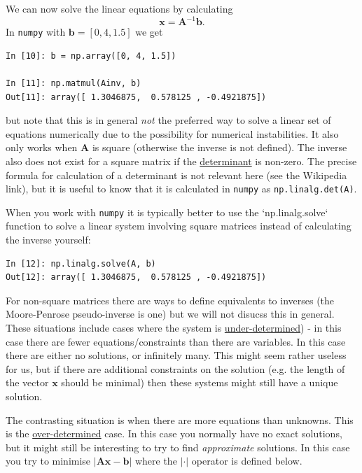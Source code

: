\documentclass[a4paper,10pt]{article}
\newcommand{\link}[2]{{\color{blue}\href{#1}{#2}}}
\begin{document}
We can now solve the linear equations by calculating
$$\mathbf{x} = \mathbf{A}^{-1} \mathbf{b}.$$ In \texttt{numpy} with $\mathbf{b}=[0,  4, 1.5]$ we get

\begin{lstlisting}
In [10]: b = np.array([0, 4, 1.5])

In [11]: np.matmul(Ainv, b)
Out[11]: array([ 1.3046875,  0.578125 , -0.4921875])
\end{lstlisting}

but note that this is in general \textit{not} the preferred way to solve a linear set of equations numerically due to the possibility for numerical instabilities. It also only works when $\mathbf{A}$ is square (otherwise the inverse is not defined). The inverse also does not exist for a square matrix if the \link{https://en.wikipedia.org/wiki/Determinant}{determinant} is non-zero. The precise formula for calculation of a determinant is not relevant here (see the Wikipedia link), but it is useful to know that it is calculated in \texttt{numpy} as \texttt{np.linalg.det(A)}. 

When you work with \texttt{numpy} it is typically better to use the `np.linalg.solve` function to solve a linear system involving square matrices instead of calculating the inverse yourself:
\begin{lstlisting}
In [12]: np.linalg.solve(A, b)
Out[12]: array([ 1.3046875,  0.578125 , -0.4921875])
\end{lstlisting}

For non-square matrices there are ways to define equivalents to inverses (the Moore-Penrose pseudo-inverse is one) but we will not disucss this in general. These situations include cases where the system is \link{https://en.wikipedia.org/wiki/Underdetermined_system}{under-determined}) - in this case there are fewer equations/constraints than there are variables. In this case there are either no solutions, or infinitely many. This might seem rather useless for us, but if there are additional constraints on the solution (e.g. the length of the vector $\mathbf{x}$ should be minimal) then these systems might still have a unique solution.

The contrasting situation is when there are more equations than unknowns. This is the \link{https://en.wikipedia.org/wiki/Overdetermined_system}{over-determined}
 case. In this case you normally have no exact solutions, but it might still be interesting to try to find \textit{approximate} solutions. In this case you try to minimise $|\mathbf{A}\mathbf{x} - \mathbf{b}|$ where the $|\cdot|$ operator is defined below.
\end{document}
